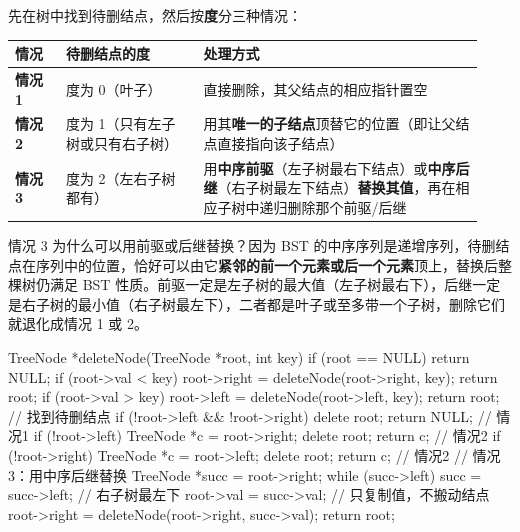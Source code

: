 \documentclass[11pt,openany,UTF8]{ctexbook}
\begin{document}
先在树中找到待删结点，然后按\textbf{度}分三种情况：

\begingroup\small\setlength{\tabcolsep}{4.0pt}
\begin{longtable}{@{}L{0.1020\linewidth}L{0.2740\linewidth}L{0.5525\linewidth}@{}}
\toprule
\textbf{情况} & \textbf{待删结点的度} & \textbf{处理方式} \\
\midrule
\endhead
\textbf{情况 1} & 度为 0（叶子） & 直接删除，其父结点的相应指针置空 \\
\textbf{情况 2} & 度为 1（只有左子树或只有右子树） & 用其\textbf{唯一的子结点}顶替它的位置（即让父结点直接指向该子结点） \\
\textbf{情况 3} & 度为 2（左右子树都有） & 用\textbf{中序前驱}（左子树最右下结点）或\textbf{中序后继}（右子树最左下结点）\textbf{替换其值}，再在相应子树中递归删除那个前驱/后继 \\
\bottomrule
\end{longtable}
\endgroup

情况 3 为什么可以用前驱或后继替换？因为 BST 的中序序列是递增序列，待删结点在序列中的位置，恰好可以由它\textbf{紧邻的前一个元素或后一个元素}顶上，替换后整棵树仍满足 BST 性质。前驱一定是左子树的最大值（左子树最右下），后继一定是右子树的最小值（右子树最左下），二者都是叶子或至多带一个子树，删除它们就退化成情况 1 或 2。

\begin{codebox}
TreeNode *deleteNode(TreeNode *root, int key) {
    if (root == NULL) return NULL;
    if (root->val < key) { root->right = deleteNode(root->right, key); return root; }
    if (root->val > key) { root->left  = deleteNode(root->left,  key); return root; }
    // 找到待删结点
    if (!root->left && !root->right) { delete root; return NULL; }      // 情况1
    if (!root->left)  { TreeNode *c = root->right; delete root; return c; }  // 情况2
    if (!root->right) { TreeNode *c = root->left;  delete root; return c; }  // 情况2
    // 情况3：用中序后继替换
    TreeNode *succ = root->right;
    while (succ->left) succ = succ->left;      // 右子树最左下
    root->val = succ->val;                     // 只复制值，不搬动结点
    root->right = deleteNode(root->right, succ->val);
    return root;
}
\end{codebox}
\end{document}
